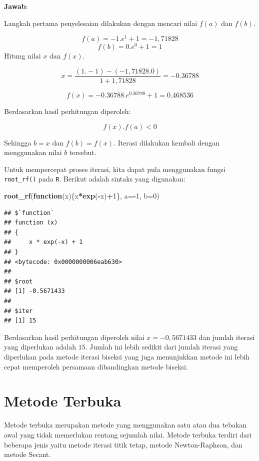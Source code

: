 \documentclass[]{book}
\newenvironment{Shaded}{\begin{snugshade}}{\end{snugshade}}
\newcommand{\ControlFlowTok}[1]{\textcolor[rgb]{0.13,0.29,0.53}{\textbf{#1}}}
\newcommand{\DataTypeTok}[1]{\textcolor[rgb]{0.13,0.29,0.53}{#1}}
\newcommand{\DecValTok}[1]{\textcolor[rgb]{0.00,0.00,0.81}{#1}}
\newcommand{\KeywordTok}[1]{\textcolor[rgb]{0.13,0.29,0.53}{\textbf{#1}}}
\newcommand{\NormalTok}[1]{#1}
\newcommand{\OperatorTok}[1]{\textcolor[rgb]{0.81,0.36,0.00}{\textbf{#1}}}
\theoremstyle{definition}
\theoremstyle{definition}
\theoremstyle{definition}
\theoremstyle{remark}
\begin{document}
\textbf{Jawab}:

Langkah pertama penyelesaian dilakukan dengan mencari nilai \(f\left(a \right)\) dan \(f\left(b \right)\).

\[
f\left(a \right)=-1.e^{1}+1=-1,71828
\]
\[
f\left(b \right)=0.e^{0}+1=1
\]
Hitung nilai \(x\) dan \(f\left(x \right)\).

\[
x=\frac{\left(1.-1\right)-\left(-1,71828.0\right)}{1+1,71828}=-0.36788
\]

\[
f\left(x \right)=-0.36788.e^{0.36788}+1=0.468536
\]

Berdasarkan hasil perhitungan diperoleh:

\[
f\left(x \right).f\left(a \right)<0
\]

Sehingga \(b=x\) dan \(f\left(b \right)=f\left(x \right)\). Iterasi dilakukan kembali dengan menggunakan nilai \(b\) tersebut.

Untuk mempercepat proses iterasi, kita dapat pula menggunakan fungsi \texttt{root\_rf()} pada \texttt{R}. Berikut adalah sintaks yang digunakan:

\begin{Shaded}
\begin{Highlighting}[]
\KeywordTok{root_rf}\NormalTok{(}\ControlFlowTok{function}\NormalTok{(x)\{x}\OperatorTok{*}\KeywordTok{exp}\NormalTok{(}\OperatorTok{-}\NormalTok{x)}\OperatorTok{+}\DecValTok{1}\NormalTok{\},}
               \DataTypeTok{a=}\OperatorTok{-}\DecValTok{1}\NormalTok{, }\DataTypeTok{b=}\DecValTok{0}\NormalTok{)}
\end{Highlighting}
\end{Shaded}

\begin{verbatim}
## $`function`
## function (x) 
## {
##     x * exp(-x) + 1
## }
## <bytecode: 0x0000000006eab630>
## 
## $root
## [1] -0.5671433
## 
## $iter
## [1] 15
\end{verbatim}

Berdasarkan hasil perhitungan diperoleh nilai \(x=-0,5671433\) dan jumlah iterasi yang diperlukan adalah \(15\). Jumlah ini lebih sedikit dari jumlah iterasi yang diperlukan pada metode iterasi biseksi yang juga menunjukkan metode ini lebih cepat memperoleh persamaan dibandingkan metode biseksi.

\hypertarget{openmethod}{%
\section{Metode Terbuka}\label{openmethod}}

Metode terbuka merupakan metode yang menggunakan satu atau dua tebakan awal yang tidak memerlukan rentang sejumlah nilai. Metode terbuka terdiri dari beberapa jenis yaitu metode iterasi titik tetap, metode Newton-Raphson, dan metode Secant.
\end{document}
